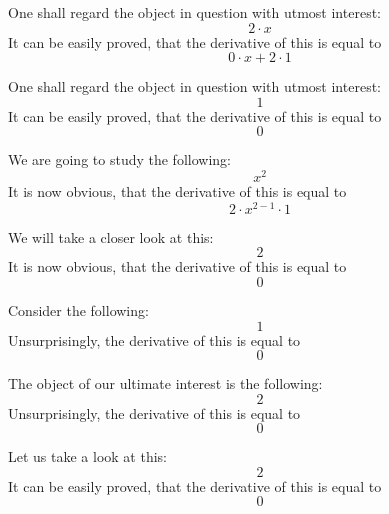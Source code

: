 \documentclass{article}
\begin{document}
One shall regard the object in question with utmost interest:
\begin{equation}
2 \cdot x 
\end{equation}
It can be easily proved, that the derivative of this is equal to
\begin{equation}
0 \cdot x + 2 \cdot 1 
\end{equation}

One shall regard the object in question with utmost interest:
\begin{equation}
1 
\end{equation}
It can be easily proved, that the derivative of this is equal to
\begin{equation}
0 
\end{equation}

We are going to study the following:
\begin{equation}
x ^{2 } 
\end{equation}
It is now obvious, that the derivative of this is equal to
\begin{equation}
2 \cdot x ^{2 - 1 } \cdot 1 
\end{equation}

We will take a closer look at this:
\begin{equation}
2 
\end{equation}
It is now obvious, that the derivative of this is equal to
\begin{equation}
0 
\end{equation}

Consider the following:
\begin{equation}
1 
\end{equation}
Unsurprisingly, the derivative of this is equal to
\begin{equation}
0 
\end{equation}

The object of our ultimate interest is the following:
\begin{equation}
2 
\end{equation}
Unsurprisingly, the derivative of this is equal to
\begin{equation}
0 
\end{equation}

Let us take a look at this:
\begin{equation}
2 
\end{equation}
It can be easily proved, that the derivative of this is equal to
\begin{equation}
0 
\end{equation}
\end{document}
